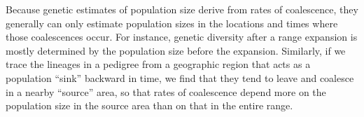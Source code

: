 \documentclass{ar-1col}
\newcommand{\todo}[1]{{\textbf{\color{red}{#1}}}}
\begin{document}
Because genetic estimates of population size 
derive from rates of coalescence,
they generally can only estimate population sizes 
in the locations and times where those coalescences occur.
For instance, genetic diversity after a range expansion 
is mostly determined by the population size before the expansion.
Similarly, if we trace the lineages in a pedigree 
from a geographic region that acts as a population ``sink'' backward in time, 
we find that they tend to leave and coalesce in a nearby ``source'' area,
so that rates of coalescence depend more on the population size in the source area
than on that in the entire range.


\end{document}
